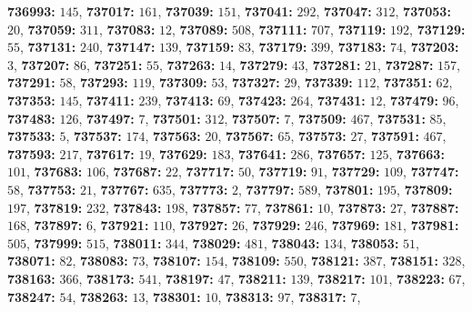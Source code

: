 \textsf{\bfseries 736993:} $145$, \textsf{\bfseries 737017:} $161$, \textsf{\bfseries 737039:} $151$, \textsf{\bfseries 737041:} $292$, \textsf{\bfseries 737047:} $312$, \textsf{\bfseries 737053:} $20$, \textsf{\bfseries 737059:} $311$, \textsf{\bfseries 737083:} $12$, \textsf{\bfseries 737089:} $508$, \textsf{\bfseries 737111:} $707$, \textsf{\bfseries 737119:} $192$, \textsf{\bfseries 737129:} $55$, \textsf{\bfseries 737131:} $240$, \textsf{\bfseries 737147:} $139$, \textsf{\bfseries 737159:} $83$, \textsf{\bfseries 737179:} $399$, \textsf{\bfseries 737183:} $74$, \textsf{\bfseries 737203:} $3$, \textsf{\bfseries 737207:} $86$, \textsf{\bfseries 737251:} $55$, \textsf{\bfseries 737263:} $14$, \textsf{\bfseries 737279:} $43$, \textsf{\bfseries 737281:} $21$, \textsf{\bfseries 737287:} $157$, \textsf{\bfseries 737291:} $58$, \textsf{\bfseries 737293:} $119$, \textsf{\bfseries 737309:} $53$, \textsf{\bfseries 737327:} $29$, \textsf{\bfseries 737339:} $112$, \textsf{\bfseries 737351:} $62$, \textsf{\bfseries 737353:} $145$, \textsf{\bfseries 737411:} $239$, \textsf{\bfseries 737413:} $69$, \textsf{\bfseries 737423:} $264$, \textsf{\bfseries 737431:} $12$, \textsf{\bfseries 737479:} $96$, \textsf{\bfseries 737483:} $126$, \textsf{\bfseries 737497:} $7$, \textsf{\bfseries 737501:} $312$, \textsf{\bfseries 737507:} $7$, \textsf{\bfseries 737509:} $467$, \textsf{\bfseries 737531:} $85$, \textsf{\bfseries 737533:} $5$, \textsf{\bfseries 737537:} $174$, \textsf{\bfseries 737563:} $20$, \textsf{\bfseries 737567:} $65$, \textsf{\bfseries 737573:} $27$, \textsf{\bfseries 737591:} $467$, \textsf{\bfseries 737593:} $217$, \textsf{\bfseries 737617:} $19$, \textsf{\bfseries 737629:} $183$, \textsf{\bfseries 737641:} $286$, \textsf{\bfseries 737657:} $125$, \textsf{\bfseries 737663:} $101$, \textsf{\bfseries 737683:} $106$, \textsf{\bfseries 737687:} $22$, \textsf{\bfseries 737717:} $50$, \textsf{\bfseries 737719:} $91$, \textsf{\bfseries 737729:} $109$, \textsf{\bfseries 737747:} $58$, \textsf{\bfseries 737753:} $21$, \textsf{\bfseries 737767:} $635$, \textsf{\bfseries 737773:} $2$, \textsf{\bfseries 737797:} $589$, \textsf{\bfseries 737801:} $195$, \textsf{\bfseries 737809:} $197$, \textsf{\bfseries 737819:} $232$, \textsf{\bfseries 737843:} $198$, \textsf{\bfseries 737857:} $77$, \textsf{\bfseries 737861:} $10$, \textsf{\bfseries 737873:} $27$, \textsf{\bfseries 737887:} $168$, \textsf{\bfseries 737897:} $6$, \textsf{\bfseries 737921:} $110$, \textsf{\bfseries 737927:} $26$, \textsf{\bfseries 737929:} $246$, \textsf{\bfseries 737969:} $181$, \textsf{\bfseries 737981:} $505$, \textsf{\bfseries 737999:} $515$, \textsf{\bfseries 738011:} $344$, \textsf{\bfseries 738029:} $481$, \textsf{\bfseries 738043:} $134$, \textsf{\bfseries 738053:} $51$, \textsf{\bfseries 738071:} $82$, \textsf{\bfseries 738083:} $73$, \textsf{\bfseries 738107:} $154$, \textsf{\bfseries 738109:} $550$, \textsf{\bfseries 738121:} $387$, \textsf{\bfseries 738151:} $328$, \textsf{\bfseries 738163:} $366$, \textsf{\bfseries 738173:} $541$, \textsf{\bfseries 738197:} $47$, \textsf{\bfseries 738211:} $139$, \textsf{\bfseries 738217:} $101$, \textsf{\bfseries 738223:} $67$, \textsf{\bfseries 738247:} $54$, \textsf{\bfseries 738263:} $13$, \textsf{\bfseries 738301:} $10$, \textsf{\bfseries 738313:} $97$, \textsf{\bfseries 738317:} $7$, 
